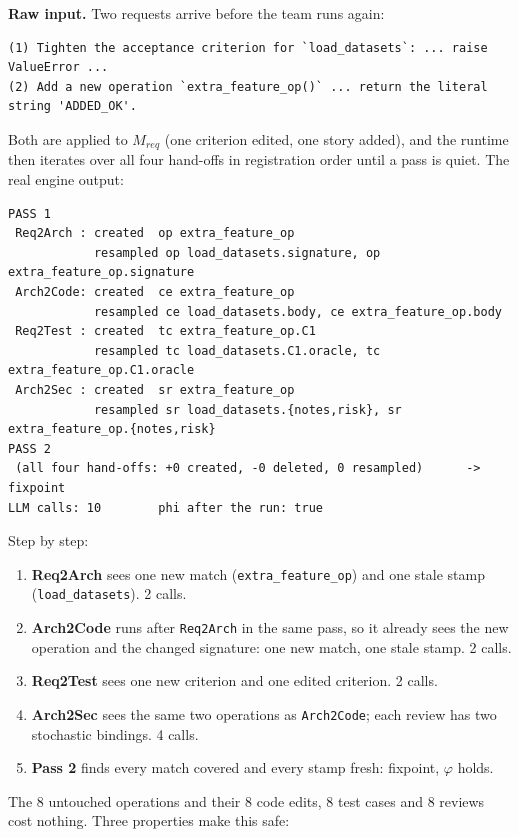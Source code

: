 \documentclass[10pt,a4paper]{article}
\newcommand{\code}[1]{\texttt{#1}}
\theoremstyle{definition}
\newcommand{\what}[1]{\par\smallskip\noindent\textbf{#1}\quad}
\begin{document}
\what{Raw input.} Two requests arrive before the team runs again:
\begin{lstlisting}[style=raw]
(1) Tighten the acceptance criterion for `load_datasets`: ... raise ValueError ...
(2) Add a new operation `extra_feature_op()` ... return the literal string 'ADDED_OK'.
\end{lstlisting}

Both are applied to $M_{\mathit{req}}$ (one criterion edited, one story
added), and the runtime then iterates over all four hand-offs in
registration order until a pass is quiet. The real engine output:

\begin{lstlisting}[style=engine, caption={Engine output: two concurrent Analyst changes, four hand-offs.}, label={lst:multi}]
PASS 1
 Req2Arch : created  op extra_feature_op
            resampled op load_datasets.signature, op extra_feature_op.signature
 Arch2Code: created  ce extra_feature_op
            resampled ce load_datasets.body, ce extra_feature_op.body
 Req2Test : created  tc extra_feature_op.C1
            resampled tc load_datasets.C1.oracle, tc extra_feature_op.C1.oracle
 Arch2Sec : created  sr extra_feature_op
            resampled sr load_datasets.{notes,risk}, sr extra_feature_op.{notes,risk}
PASS 2
 (all four hand-offs: +0 created, -0 deleted, 0 resampled)      -> fixpoint
LLM calls: 10        phi after the run: true
\end{lstlisting}

Step by step:
\begin{enumerate}[nosep]
\item \textbf{Req2Arch} sees one new match (\code{extra_feature_op}) and one
stale stamp (\code{load_datasets}). 2 calls.
\item \textbf{Arch2Code} runs after \code{Req2Arch} in the same pass, so it
already sees the new operation and the changed signature: one new match, one
stale stamp. 2 calls.
\item \textbf{Req2Test} sees one new criterion and one edited criterion. 2 calls.
\item \textbf{Arch2Sec} sees the same two operations as \code{Arch2Code}; each
review has two stochastic bindings. 4 calls.
\item \textbf{Pass 2} finds every match covered and every stamp fresh:
fixpoint, $\varphi$ holds.
\end{enumerate}

The 8 untouched operations and their 8 code edits, 8 test cases and 8
reviews cost nothing. Three properties make this safe:
\end{document}
